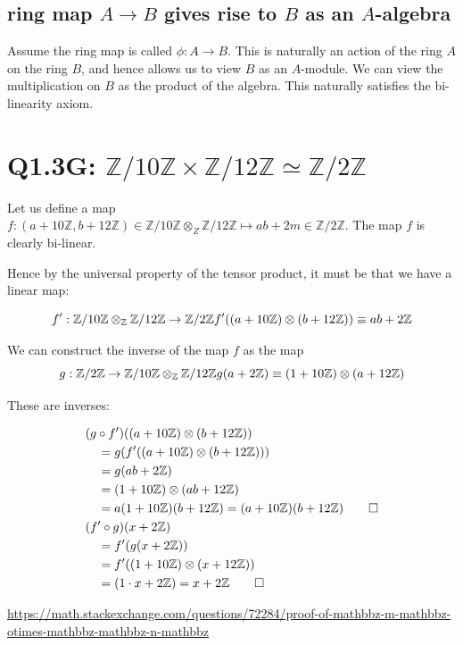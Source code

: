 \documentclass{book}
\newcommand{\Z}{\ensuremath{\mathbb{Z}}}
\theoremstyle{definition}
\begin{document}
\subsection{ring map $A \rightarrow B$ gives rise to $B$ as an $A$-algebra}
Assume the ring map is called $\phi: A \rightarrow B$. This is naturally an
action of the ring $A$ on the ring $B$, and hence allows us to view $B$ as
an $A$-module. We can view the multiplication on $B$ as the product of
the algebra. This naturally satisfies the bi-linearity axiom.

\section{Q1.3G: $\Z/10\Z \times \Z/12\Z \simeq \Z/2\Z$}

Let us define a map $f: (a + 10\Z, b + 12\Z) \in \Z/10\Z \otimes_Z \Z/12\Z \mapsto ab + 2m \in \Z/2\Z$.
The map $f$ is clearly bi-linear.

Hence by the universal property of the tensor product, it must be that
we have a linear map:

$$
f': \Z/10\Z \otimes_\Z \Z/12\Z \rightarrow \Z/2\Z \\
f'((a + 10\Z) \otimes (b + 12\Z)) \equiv ab + 2\Z
$$


We can construct the inverse of the map $f$ as the map
$$
g: \Z/2\Z \rightarrow \Z/10\Z \otimes_\Z \Z/12\Z\\
g(a + 2\Z) \equiv (1 + 10\Z)\otimes (a + 12\Z)
$$

These are inverses:

\begin{align*}
&(g \circ f') ((a + 10\Z) \otimes (b + 12\Z)) \\
&\quad = g(f'((a + 10\Z) \otimes (b + 12\Z))) \\
&\quad = g(ab + 2\Z) \\
&\quad = (1 + 10\Z) \otimes (ab + 12 \Z) \\
&\quad = a(1 + 10\Z)(b + 12\Z) = (a + 10\Z)(b + 12\Z) \qed
\\
&(f' \circ g)(x + 2\Z)  \\
&\quad = f'(g(x + 2\Z)) \\
&\quad = f'((1 + 10\Z)\otimes (x + 12\Z)) \\
&\quad = (1\cdot x + 2\Z) = x + 2\Z \qed
\end{align*}

\href{Question on math.se}{https://math.stackexchange.com/questions/72284/proof-of-mathbbz-m-mathbbz-otimes-mathbbz-mathbbz-n-mathbbz}
\end{document}
